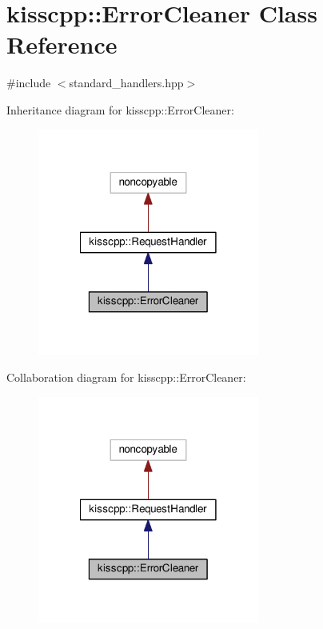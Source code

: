 \hypertarget{classkisscpp_1_1_error_cleaner}{\section{kisscpp\-:\-:Error\-Cleaner Class Reference}
\label{classkisscpp_1_1_error_cleaner}
}


{\ttfamily \#include $<$standard\-\_\-handlers.\-hpp$>$}



Inheritance diagram for kisscpp\-:\-:Error\-Cleaner\-:
\nopagebreak
\begin{figure}[H]
\begin{center}
\leavevmode
\includegraphics[width=206pt]{classkisscpp_1_1_error_cleaner__inherit__graph}
\end{center}
\end{figure}


Collaboration diagram for kisscpp\-:\-:Error\-Cleaner\-:
\nopagebreak
\begin{figure}[H]
\begin{center}
\leavevmode
\includegraphics[width=206pt]{classkisscpp_1_1_error_cleaner__coll__graph}
\end{center}
\end{figure}
